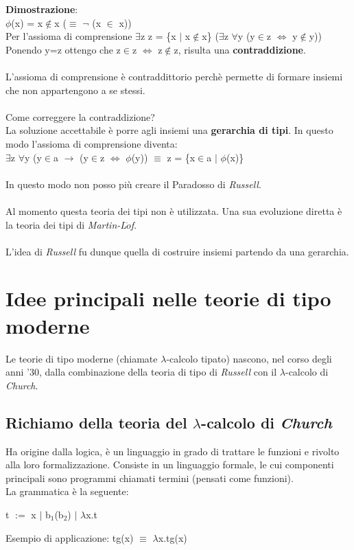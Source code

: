 \noindent \textbf{Dimostrazione}:\\
$\phi$(x) = x$\notin$x ($\equiv$ $\neg$ (x $\in$ x))\\
Per l'assioma di comprensione	$\exists$z z = \{x $|$ x$\notin$x\} ($\exists$z $\forall$y (y$\in$z $\Leftrightarrow$ y$\notin$y))\\
Ponendo y=z ottengo che z$\in$z $\Leftrightarrow$ z$\notin$z, risulta una \textbf{contraddizione}.\\\\
L'assioma di comprensione \`e contraddittorio perch\`e permette di formare insiemi che non appartengono a se stessi.\\\\
Come correggere la contraddizione?\\
La soluzione accettabile \`e porre agli insiemi una \textbf{gerarchia di tipi}. In questo modo l'assioma di comprensione diventa:\\
$\exists$z $\forall$y (y$\in$a $\to$ (y$\in$z $\Leftrightarrow$ $\phi$(y)) $\equiv$ z = \{x$\in$a $\big|$ $\phi$(x)\}\\\\
In questo modo non posso pi\`u creare il Paradosso di \textit{Russell}.\\\\
Al momento questa teoria dei tipi non \`e utilizzata. Una sua evoluzione diretta \`e 
la teoria dei tipi di \textit{Martin-L$\ddot{o}$f}.\\\\
L'idea di \textit{Russell} fu dunque quella di costruire insiemi partendo da una gerarchia.

\section{Idee principali nelle teorie di tipo moderne}
\label{sec:idee-teorie-moderne}
Le teorie di tipo moderne (chiamate $\lambda$-calcolo tipato) nascono, nel corso degli anni '30, dalla combinazione della teoria di tipo di \textit{Russell} con il $\lambda$-calcolo di \textit{Church}.

\subsection{Richiamo della teoria del $\lambda$-calcolo di \textit{Church}}
\label{subsec:lambda-calcolo}
Ha origine dalla logica, \`e un linguaggio in grado di trattare le funzioni e rivolto alla loro formalizzazione. Consiste in un linguaggio formale, le cui componenti principali sono programmi chiamati termini (pensati come funzioni).\\ La grammatica \`e la seguente:
\begin{center} t $:=$ x $|$ b$_1$(b$_2$) $|$ $\lambda$x.t \end{center}
Esempio di applicazione: tg(x) $\equiv$ $\lambda$x.tg(x)

